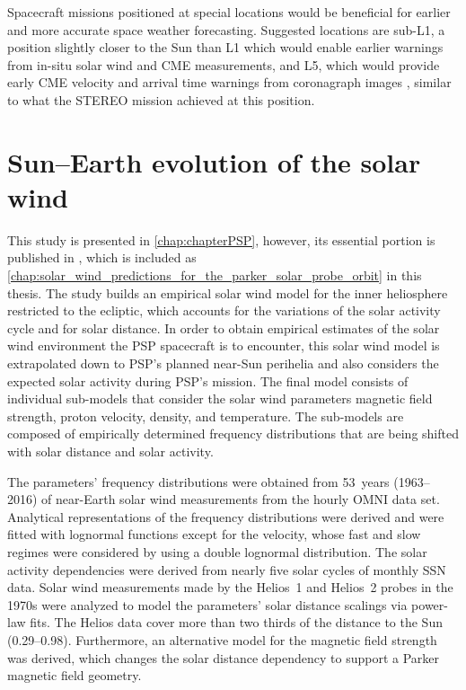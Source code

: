 Spacecraft missions positioned at special locations would be beneficial for earlier and more accurate space weather forecasting. Suggested locations are sub-L1, a position slightly closer to the Sun than L1 which would enable earlier warnings from in-situ solar wind and CME measurements, and L5, which would provide early CME velocity and arrival time warnings from coronagraph images \citep{Vourlidas2015}, similar to what the STEREO mission achieved at this position.

\clearpage


\section{Sun--Earth evolution of the solar wind}
This study is presented in \autoref{chap:chapterPSP}, however, its essential portion is published in \citet{Venzmer2018}, which is included as \autoref{chap:solar_wind_predictions_for_the_parker_solar_probe_orbit} in this thesis.
The study builds an empirical solar wind model for the inner heliosphere restricted to the ecliptic, which accounts for the variations of the solar activity cycle and for solar distance. In order to obtain empirical estimates of the solar wind environment the PSP spacecraft is to encounter, this solar wind model is extrapolated down to PSP's planned near-Sun perihelia and also considers the expected solar activity during PSP's mission.
The final model consists of individual sub-models that consider the solar wind parameters magnetic field strength, proton velocity, density, and temperature. The sub-models are composed of empirically determined frequency distributions that are being shifted with solar distance and solar activity.

The parameters' frequency distributions were obtained from 53~years (1963--2016) of near-Earth solar wind measurements from the hourly OMNI data set. Analytical representations of the frequency distributions were derived and were fitted with lognormal functions except for the velocity, whose fast and slow regimes were considered by using a double lognormal distribution. The solar activity dependencies were derived from nearly five solar cycles of monthly SSN data. Solar wind measurements made by the Helios~1 and Helios~2 probes in the 1970s were analyzed to model the parameters' solar distance scalings via power-law fits. The Helios data cover more than two thirds of the distance to the Sun (\SIrange{0.29}{0.98}{\au}). Furthermore, an alternative model for the magnetic field strength was derived, which changes the solar distance dependency to support a Parker magnetic field geometry.

